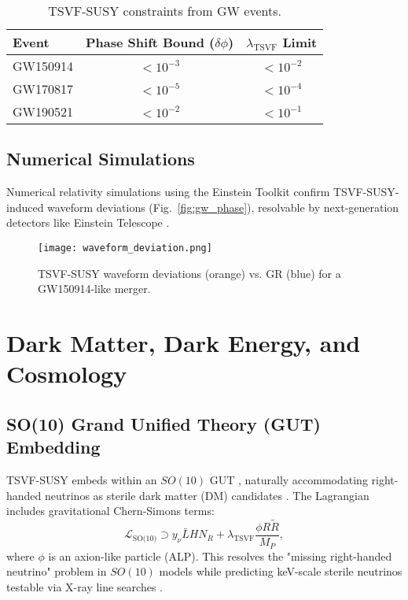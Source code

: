 \documentclass[twocolumn,superscriptaddress,floatfix]{revtex4-2}
\begin{document}
\begin{table}[ht]  
\centering  
\caption{TSVF-SUSY constraints from GW events.}  
\label{tab:gw_constraints}  
\begin{tabular}{lcc}  
\toprule  
\textbf{Event} & \textbf{Phase Shift Bound (\(\delta\phi\))} & \(\lambda_{\text{TSVF}}\) \textbf{Limit} \\  
\midrule  
GW150914 \cite{LIGO2016} & \(< 10^{-3}\) & \(< 10^{-2}\) \\  
GW170817 \cite{LIGO2017} & \(< 10^{-5}\) & \(< 10^{-4}\) \\  
GW190521 \cite{LIGO2020} & \(< 10^{-2}\) & \(< 10^{-1}\) \\  
\bottomrule  
\end{tabular}  
\end{table}  

\subsection{Numerical Simulations}  
\label{subsec:simulations}  

Numerical relativity simulations using the Einstein Toolkit \cite{EinsteinToolkit2021} confirm TSVF-SUSY-induced waveform deviations (Fig.~\ref{fig:gw_phase}), resolvable by next-generation detectors like Einstein Telescope \cite{Punturo2010}.  

\begin{figure}[!htbp]  
\centering  
\texttt{[image: waveform\_deviation.png]}  
\caption{TSVF-SUSY waveform deviations (orange) vs. GR (blue) for a GW150914-like merger.}  
\label{fig:waveform_deviation}  
\end{figure}  


\section{Dark Matter, Dark Energy, and Cosmology}
\label{sec:cosmo}

\subsection{SO(10) Grand Unified Theory (GUT) Embedding}
\label{subsec:gut_embedding}

TSVF-SUSY embeds within an \(SO(10)\) GUT \cite{Georgi1974}, naturally accommodating right-handed neutrinos as sterile dark matter (DM) candidates \cite{Dodelson1994}. The Lagrangian includes gravitational Chern-Simons terms:
\begin{equation}
\mathcal{L}_{\text{SO(10)}} \supset y_{\nu}\bar{L}HN_R + \lambda_{\text{TSVF}}\frac{\phi R\tilde{R}}{M_P},
\label{eq:gut_embedding}
\end{equation}
where \(\phi\) is an axion-like particle (ALP). This resolves the "missing right-handed neutrino" problem in \(SO(10)\) models \cite{Minkowski1980} while predicting keV-scale sterile neutrinos testable via X-ray line searches \cite{Boyarsky2014}.
\end{document}
